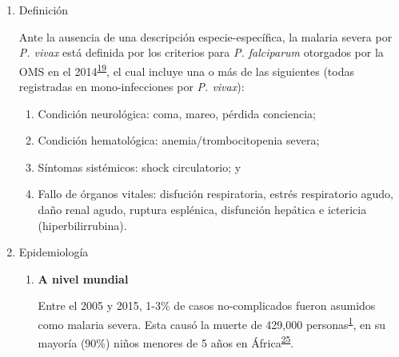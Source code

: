 \documentclass[a4paper]{article}
\providecommand{\tightlist}{%
  \setlength{\itemsep}{0pt}\setlength{\parskip}{0pt}}
\begin{document}
\begin{enumerate}
\def\labelenumi{\alph{enumi}.}
\item
  Definición

  Ante la ausencia de una descripción especie-específica, la malaria
  severa por \emph{P. vivax} está definida por los criterios para
  \emph{P. falciparum} otorgados por la OMS en el
  2014\textsuperscript{\protect\hyperlink{ref-WHO2014severe}{19}}, el
  cual incluye una o más de las siguientes (todas registradas en
  mono-infecciones por \emph{P. vivax}):

  \begin{enumerate}
  \def\labelenumii{\arabic{enumii}.}
  \tightlist
  \item
    Condición neurológica: coma, mareo, pérdida conciencia;
  \item
    Condición hematológica: anemia/trombocitopenia severa;
  \item
    Síntomas sistémicos: shock circulatorio; y
  \item
    Fallo de órganos vitales: disfución respiratoria, estrés
    respiratorio agudo, daño renal agudo, ruptura esplénica, disfunción
    hepática e ictericia (hiperbilirrubina).
  \end{enumerate}
\item
  Epidemiología

  \begin{enumerate}
  \def\labelenumii{\roman{enumii}.}
  \item
    \textbf{A nivel mundial}

    Entre el 2005 y 2015, 1-3\% de casos no-complicados fueron asumidos
    como malaria severa. Esta causó la muerte de 429,000
    personas\textsuperscript{\protect\hyperlink{ref-WHO2016world}{1}},
    en su mayoría (90\%) niños menores de 5 años en
    África\textsuperscript{\protect\hyperlink{ref-wassmer2015}{25}}.


\end{enumerate}
\end{enumerate}
\end{document}

